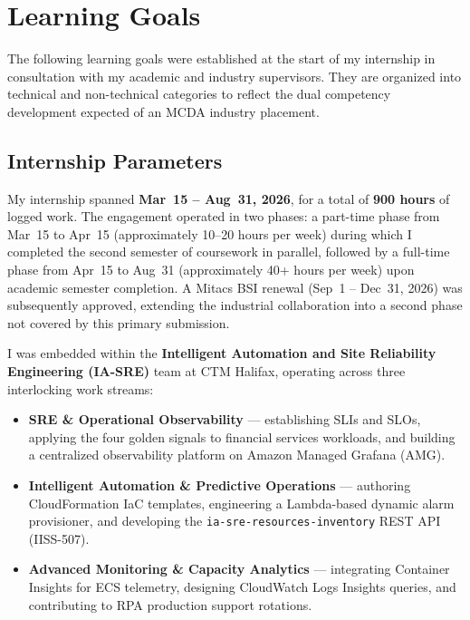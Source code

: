 
\chapter{Learning Goals}
\label{chap:learning_goals}

The following learning goals were established at the start of my internship in
consultation with my academic and industry supervisors. They are organized into
technical and non-technical categories to reflect the dual competency development
expected of an MCDA industry placement.

\section{Internship Parameters}

My internship spanned \textbf{Mar~15 -- Aug~31, 2026}, for a total of
\textbf{900 hours} of logged work. The engagement operated in two phases:
a part-time phase from Mar~15 to Apr~15 (approximately 10--20 hours per
week) during which I completed the second semester of coursework in
parallel, followed by a full-time phase from Apr~15 to Aug~31
(approximately 40+ hours per week) upon academic semester completion. A
Mitacs BSI renewal (Sep~1 -- Dec~31, 2026) was subsequently
approved, extending the industrial collaboration into a second phase not
covered by this primary submission.

I was embedded within the \textbf{Intelligent Automation and
Site Reliability Engineering (IA-SRE)} team at CTM Halifax, operating
across three interlocking work streams:

\begin{itemize}
    \item \textbf{SRE \& Operational Observability} --- establishing SLIs
          and SLOs, applying the four golden signals to financial services
          workloads, and building a centralized observability platform on
          Amazon Managed Grafana (AMG).

    \item \textbf{Intelligent Automation \& Predictive Operations} ---
          authoring CloudFormation IaC templates, engineering a
          Lambda-based dynamic alarm provisioner, and developing the
          \texttt{ia-sre-resources-inventory} REST API (IISS-507).

    \item \textbf{Advanced Monitoring \& Capacity Analytics} ---
          integrating Container Insights for ECS telemetry, designing
          CloudWatch Logs Insights queries, and contributing to RPA
          production support rotations.
\end{itemize}

